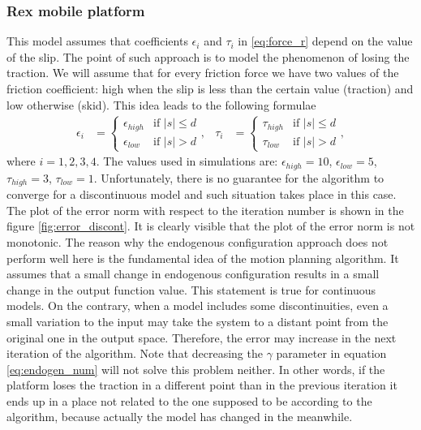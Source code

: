 \subsubsection{Rex mobile platform}
This model assumes that coefficients $\epsilon_i$ and $\tau_i$ in \eqref{eq:force_r} depend on the value of the slip. The point of such approach is to model the phenomenon of losing the traction. We will assume that for every friction force we have two values of the friction coefficient: high when the slip is less than the certain value (traction) and low otherwise (skid). This idea leads to the following formulae
\begin{equation*}
\begin{aligned}
\epsilon_i&=\begin{cases}
\epsilon_{high} &\mbox{if } |s| \leq d \\
\epsilon_{low} &\mbox{if } |s| > d
\end{cases}, &
\tau_i&=\begin{cases}
\tau_{high} &\mbox{if } |s| \leq d \\
\tau_{low} &\mbox{if } |s| > d
\end{cases},
\end{aligned}
\end{equation*}
where $i=1, 2, 3, 4$. The values used in simulations are: $\epsilon_{high}=10$, $\epsilon_{low}=5$, $\tau_{high}=3$, $\tau_{low}=1$. Unfortunately, there is no guarantee for the algorithm to converge for a discontinuous model and such situation takes place in this case. The plot of the error norm with respect to the iteration number is shown in the figure \ref{fig:error_discont}. It is clearly visible that the plot of the error norm is not monotonic. The reason why the endogenous configuration approach does not perform well here is the fundamental idea of the motion planning algorithm. It assumes that a small change in endogenous configuration results in a small change in the output function value. This statement is true for continuous models. On the contrary, when a model includes some discontinuities, even a small variation to the input may take the system to a distant point from the original one in the output space. Therefore, the error may increase in the next iteration of the algorithm. Note that decreasing the $\gamma$ parameter in equation \eqref{eq:endogen_num} will not solve this problem neither.
In other words, if the platform loses the traction in a different point than in the previous iteration it ends up in a place not related to the one supposed to be according to the algorithm, because actually the model has changed in the meanwhile.
